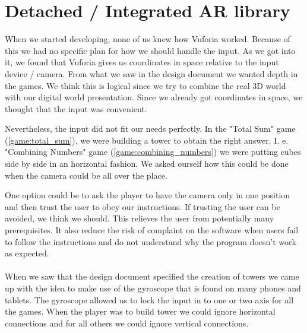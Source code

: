 \section{Detached / Integrated AR library}
\label{sect:input_handling}
When we started developing, none of us knew how Vuforia worked. Because of this
we had no specific plan for how we should handle the input. As we got into it,
we found that Vuforia gives us coordinates in space relative to the input
device / camera. From what we saw in the design document we wanted depth in the
games. We think this is logical since we try to combine the real 3D world with
our digital world presentation. Since we already got coordinates in space, we
thought that the input was convenient.

Nevertheless, the input did not fit our needs perfectly. In the "Total Sum"
game (\ref{game:total_sum}), we were building a tower to obtain the right
answer. I. e. "Combining Numbers" game (\ref{game:combining_numbers}) we were
putting cubes side by side in an horizontal fashion. We asked ourself how this
could be done when the camera could be all over the place.

One option could be to ask the player to have the camera only in one position
and then trust the user to obey our instructions. If trusting the user can be
avoided, we think we should. This relieves the user from potentially many
prerequisites. It also reduce the risk of complaint on the software when users
fail to follow the instructions and do not understand why the program doesn't
work as expected.

\paragraph{}

When we saw that the design document specified the creation of towers we came up with the idea to make use of the gyroscope that is found on many phones and tablets. The gyroscope allowed us to lock the input in to one or two axis for all the games. When the player was to build tower we could ignore horizontal connections and for all others we could ignore vertical connections. 

